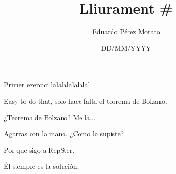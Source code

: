 \documentclass[a4paper, 12pt]{article}
\title{Lliurament \#}
\author{Eduardo Pérez Motato}
\date{DD/MM/YYYY}
\begin{document}
    \makeheader

    \begin{exercici}
        Primer exercici lalalalalalalal
    \end{exercici}
    \begin{solucio}
        Easy to do that, solo hace falta el teorema de Bolzano.
    \end{solucio}

    \begin{exercici}
        ¿Teorema de Bolzano? Me la...
    \end{exercici}
    \begin{solucio}
        Agarras con la mano. ¿Como lo supiste?
    \end{solucio}

    \begin{exercici}
        Por que sigo a RepSter.
    \end{exercici}
    \begin{solucio}
        Él siempre es la solución.
    \end{solucio}
\end{document}

